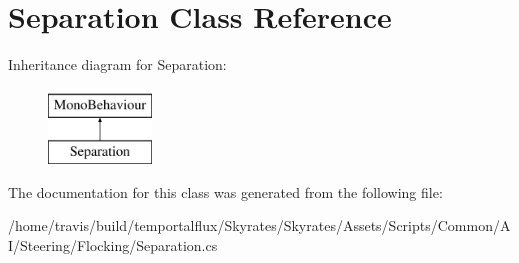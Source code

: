 \hypertarget{class_separation}{\section{Separation Class Reference}
\label{class_separation}
}
Inheritance diagram for Separation\-:\begin{figure}[H]
\begin{center}
\leavevmode
\includegraphics[height=2.000000cm]{class_separation}
\end{center}
\end{figure}


The documentation for this class was generated from the following file\-:\begin{DoxyCompactItemize}
\item 
/home/travis/build/temportalflux/\-Skyrates/\-Skyrates/\-Assets/\-Scripts/\-Common/\-A\-I/\-Steering/\-Flocking/Separation.\-cs\end{DoxyCompactItemize}
